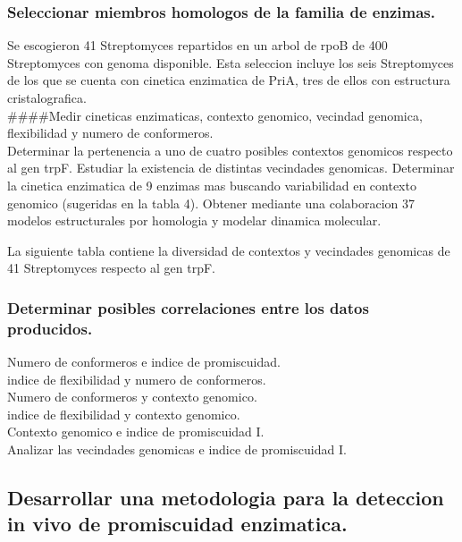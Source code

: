 \documentclass[12pt,twoside]{reedthesis}
\begin{document}
  \subsubsection{Seleccionar miembros homologos de la familia de
  enzimas.}\label{seleccionar-miembros-homologos-de-la-familia-de-enzimas.}
  
  Se escogieron 41 Streptomyces repartidos en un arbol de rpoB de 400
  Streptomyces con genoma disponible. Esta seleccion incluye los seis
  Streptomyces de los que se cuenta con cinetica enzimatica de PriA, tres
  de ellos con estructura cristalografica.\\
  \#\#\#\#Medir cineticas enzimaticas, contexto genomico, vecindad
  genomica, flexibilidad y numero de conformeros.\\
  Determinar la pertenencia a uno de cuatro posibles contextos genomicos
  respecto al gen trpF. Estudiar la existencia de distintas vecindades
  genomicas. Determinar la cinetica enzimatica de 9 enzimas mas buscando
  variabilidad en contexto genomico (sugeridas en la tabla 4). Obtener
  mediante una colaboracion 37 modelos estructurales por homologia y
  modelar dinamica molecular.
  
  La siguiente tabla contiene la diversidad de contextos y vecindades
  genomicas de 41 Streptomyces respecto al gen trpF.
  
  \subsubsection{Determinar posibles correlaciones entre los datos
  producidos.}\label{determinar-posibles-correlaciones-entre-los-datos-producidos.}
  
  Numero de conformeros e indice de promiscuidad.\\
  indice de flexibilidad y numero de conformeros.\\
  Numero de conformeros y contexto genomico.\\
  indice de flexibilidad y contexto genomico.\\
  Contexto genomico e indice de promiscuidad I.\\
  Analizar las vecindades genomicas e indice de promiscuidad I.
  
  \subsection{Desarrollar una metodologia para la deteccion in vivo de
  promiscuidad
  enzimatica.}\label{desarrollar-una-metodologia-para-la-deteccion-in-vivo-de-promiscuidad-enzimatica.}
  
\end{document}
